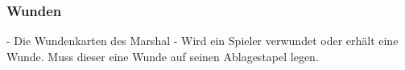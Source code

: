 
\subsubsection{Wunden}

- Die Wundenkarten des Marshal
- Wird ein Spieler verwundet oder erhält eine Wunde. Muss dieser eine Wunde auf seinen Ablagestapel legen.